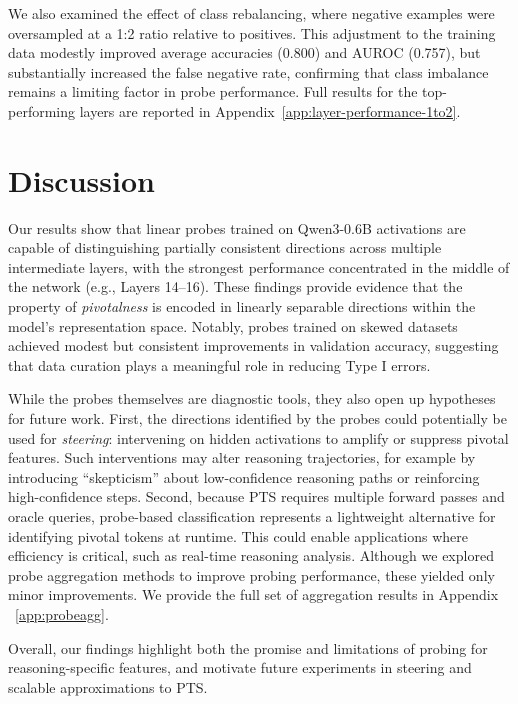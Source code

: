 \documentclass{article}
\begin{document}
We also examined the effect of class rebalancing, where negative examples were oversampled at a 1:2 ratio relative to positives. This adjustment to the training data modestly improved average accuracies (0.800) and AUROC (0.757), but substantially increased the false negative rate, confirming that class imbalance remains a limiting factor in probe performance. Full results for the top-performing layers are reported in Appendix~\ref{app:layer-performance-1to2}.


\section{Discussion}

Our results show that linear probes trained on Qwen3-0.6B activations are capable of distinguishing partially consistent directions across multiple intermediate layers, with the strongest performance concentrated in the middle of the network (e.g., Layers 14–16). These findings provide evidence that the property of \textit{pivotalness} is encoded in linearly separable directions within the model’s representation space. Notably, probes trained on skewed datasets achieved modest but consistent improvements in validation accuracy, suggesting that data curation plays a meaningful role in reducing Type I errors.

While the probes themselves are diagnostic tools, they also open up hypotheses for future work. First, the directions identified by the probes could potentially be used for \textit{steering}: intervening on hidden activations to amplify or suppress pivotal features. Such interventions may alter reasoning trajectories, for example by introducing “skepticism” about low-confidence reasoning paths or reinforcing high-confidence steps. Second, because PTS requires multiple forward passes and oracle queries, probe-based classification represents a lightweight alternative for identifying pivotal tokens at runtime. This could enable applications where efficiency is critical, such as real-time reasoning analysis. Although we explored probe aggregation methods to improve probing performance, these yielded only minor improvements. We provide the full set of aggregation results in Appendix ~\ref{app:probeagg}.

Overall, our findings highlight both the promise and limitations of probing for reasoning-specific features, and motivate future experiments in steering and scalable approximations to PTS.
\end{document}
